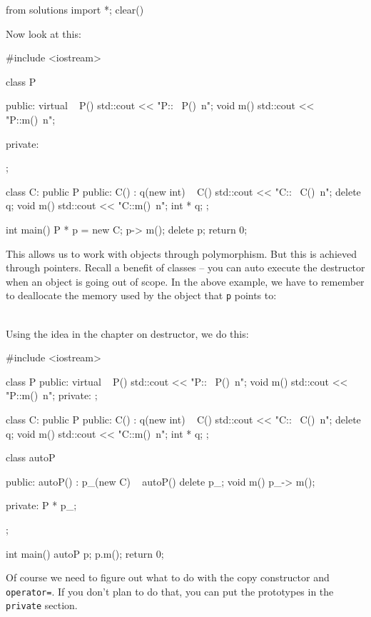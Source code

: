 \begin{python0}
from solutions import *; clear()
\end{python0}

Now look at this:

\begin{console}
#include <iostream>

class P
{
public:
     virtual ~ P() { std::cout << "P::~ P()\ n"; }
     void m() { std::cout << "P::m()\ n"; }
     
private:
};

class C: public P
{
public:
     C() : q(new int) {}
     ~ C() { std::cout <<
     "C::~ C()\ n"; delete q; }
     void m() { std::cout << "C::m()\ n"; }
     int * q;
};

int main()
{   
    P * p = new C;
    p-> m();
    delete p;
    return 0;
}
\end{console}

This allows us to work with objects through polymorphism. But this is achieved through pointers. Recall a benefit of classes -- you can auto execute the destructor when an object is going out of scope. In the above example, we have to remember to deallocate the memory used by the object that \texttt{p} points to:

\\

Using the idea in the chapter on destructor, we do this:

\begin{console}
#include <iostream>

class P
{
public:
     virtual ~ P() { std::cout << "P::~ P()\ n"; }
     void m() { std::cout << "P::m()\ n"; }
private:
};

class C: public P
{
public:
     C() : q(new int) {}
     ~ C() { std::cout << "C::~ C()\ n"; delete q; }
     void m() { std::cout << "C::m()\ n"; }
     int * q;
};

class autoP
{
public:
     autoP()
         : p_(new C)
     {}
     ~ autoP()
     { delete p_; }
     void m() { p_-> m(); }
     
private:
     P * p_;
};

int main()
{   
    autoP p;
    p.m();
    return 0;
}
\end{console}

Of course we need to figure out what to do with the copy constructor and \texttt{operator=}. If you don't plan to do that, you can put the prototypes in the \texttt{private} section.

